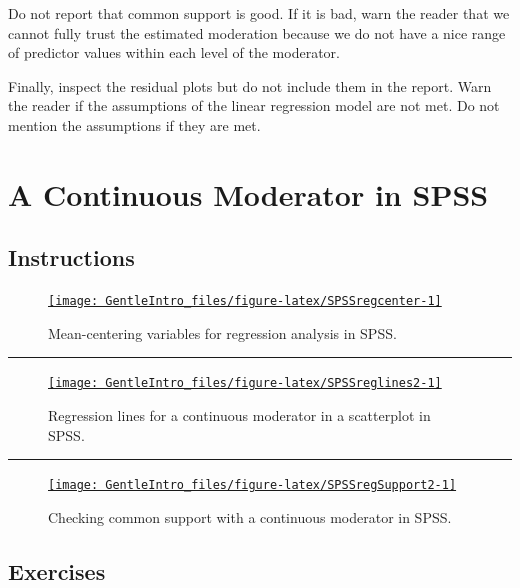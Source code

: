 \documentclass[a4paper]{book}
\theoremstyle{definition}
\theoremstyle{definition}
\theoremstyle{definition}
\theoremstyle{remark}
\begin{document}
Do not report that common support is good. If it is bad, warn the reader
that we cannot fully trust the estimated moderation because we do not
have a nice range of predictor values within each level of the
moderator.

Finally, inspect the residual plots but do not include them in the
report. Warn the reader if the assumptions of the linear regression
model are not met. Do not mention the assumptions if they are met.

\section{A Continuous Moderator in SPSS}\label{RegressionContModSPSS}

\subsection{Instructions}\label{instructions-8}

\begin{figure}[H]
\href{https://www.youtube.com/embed/2947blS-Dnc}{\texttt{[image: GentleIntro\_files/figure-latex/SPSSregcenter-1]} }\caption{Mean-centering variables for regression analysis in
SPSS.}\label{fig:SPSSregcenter}
\end{figure}

\begin{center}\rule{0.5\linewidth}{\linethickness}\end{center}

\begin{figure}[H]
\href{https://www.youtube.com/embed/8jnrg7nKsuk}{\texttt{[image: GentleIntro\_files/figure-latex/SPSSreglines2-1]} }\caption{Regression lines for a continuous moderator in a
scatterplot in SPSS.}\label{fig:SPSSreglines2}
\end{figure}

\begin{center}\rule{0.5\linewidth}{\linethickness}\end{center}

\begin{figure}[H]
\href{https://www.youtube.com/embed/_OwIfQhOAxU}{\texttt{[image: GentleIntro\_files/figure-latex/SPSSregSupport2-1]} }\caption{Checking common support with a continuous
moderator in SPSS.}\label{fig:SPSSregSupport2}
\end{figure}

\subsection{Exercises}\label{exercises-9}
\end{document}
